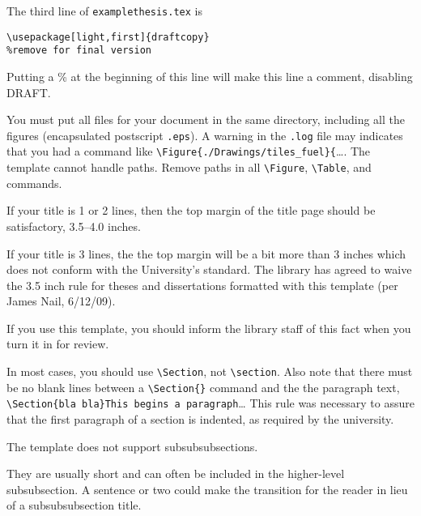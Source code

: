 %
%
The third line of {\tt examplethesis.tex} is

\newspacing{\singlespacing}\begin{verbatim}
\usepackage[light,first]{draftcopy} 
%remove for final version
\end{verbatim}

Putting a \% at the beginning of this line will make this 
line a comment, disabling DRAFT.

%
%
You must put all files for your document in the same directory,
including all the figures (encapsulated postscript {\tt *.eps}). 
A warning in the {\tt *.log} file may indicates that you had a command 
like \verb+\Figure{./Drawings/tiles_fuel}{+\ldots.
The template cannot handle paths. Remove paths in all 
\verb+\Figure+,
\verb+\Table+, 
and \verb++ commands.

%
%
If your title is 1 or 2 lines, then the top margin of the title page should be 
satisfactory, 3.5--4.0 inches.

If your title is 3 lines, the the top margin will be a bit more than 3 inches
which does not conform with the University's standard.  
The library has agreed to waive the 3.5 inch rule for theses and dissertations
formatted with this template (per James Nail, 6/12/09).

If you use this template, you should inform the library staff of this fact 
when you turn it in for review.


%
%
In most cases, 
you should use \verb+\Section+, not \verb+\section+.  
Also note that there must be no blank lines between a 
\verb+\Section{}+ command and the the paragraph text, 
\eg
\verb+\Section{bla bla}This begins a paragraph+\ldots
This rule was necessary to assure that 
the first paragraph of a section is indented, 
as required by the university.

%
%
The template does not support subsubsubsections. 

They are usually short and can often be included in the 
higher-level subsubsection.  
A sentence or two could make the transition for the
reader in lieu of a subsubsubsection title.

